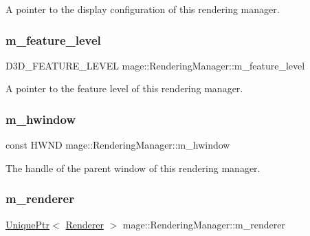 A pointer to the display configuration of this rendering manager. \hypertarget{classmage_1_1_rendering_manager_a46dc60cd94efc7ad370fd64bd9d6813d}{}\label{classmage_1_1_rendering_manager_a46dc60cd94efc7ad370fd64bd9d6813d} 
\subsubsection{\texorpdfstring{m\+\_\+feature\+\_\+level}{m\_feature\_level}}
{\footnotesize\ttfamily D3\+D\+\_\+\+F\+E\+A\+T\+U\+R\+E\+\_\+\+L\+E\+V\+EL mage\+::\+Rendering\+Manager\+::m\+\_\+feature\+\_\+level\hspace{0.3cm}{\ttfamily [private]}}

A pointer to the feature level of this rendering manager. \hypertarget{classmage_1_1_rendering_manager_a75a2ed9a4bac39c2b03960ceadd6c7dd}{}\label{classmage_1_1_rendering_manager_a75a2ed9a4bac39c2b03960ceadd6c7dd} 
\subsubsection{\texorpdfstring{m\+\_\+hwindow}{m\_hwindow}}
{\footnotesize\ttfamily const H\+W\+ND mage\+::\+Rendering\+Manager\+::m\+\_\+hwindow\hspace{0.3cm}{\ttfamily [private]}}

The handle of the parent window of this rendering manager. \hypertarget{classmage_1_1_rendering_manager_ade28531cb0299efcf297b09e9f35bd79}{}\label{classmage_1_1_rendering_manager_ade28531cb0299efcf297b09e9f35bd79} 
\subsubsection{\texorpdfstring{m\+\_\+renderer}{m\_renderer}}
{\footnotesize\ttfamily \hyperlink{namespacemage_a3316d7143a973e37adf1110f2e80ca31}{Unique\+Ptr}$<$ \hyperlink{classmage_1_1_renderer}{Renderer} $>$ mage\+::\+Rendering\+Manager\+::m\+\_\+renderer\hspace{0.3cm}{\ttfamily [private]}}

